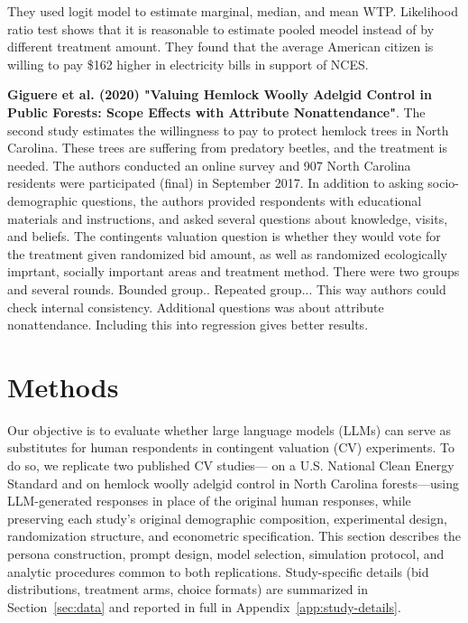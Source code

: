 \documentclass[12pt]{article}
\begin{document}
They used logit model to estimate marginal, median, and mean WTP. Likelihood ratio test shows that it is reasonable to estimate pooled meodel instead of by different treatment amount. They found that the average American citizen is willing to pay \$162 higher in electricity bills in support of NCES.

\textbf{Giguere et al. (2020) "Valuing Hemlock Woolly Adelgid Control in Public Forests: Scope Effects with Attribute Nonattendance"}. The second study estimates the willingness to pay to protect hemlock trees in North Carolina. These trees are suffering from predatory beetles, and the treatment is needed. The authors conducted an online survey and 907 North Carolina residents were participated (final) in September 2017. In addition to asking socio-demographic questions, the authors provided respondents with educational materials and instructions, and asked several questions about knowledge, visits, and beliefs. The contingents valuation question is whether they would vote for the treatment given randomized bid amount, as well as randomized ecologically imprtant, socially important areas and treatment method. There were two groups and several rounds. Bounded group.. Repeated group... This way authors could check internal consistency. Additional questions was about attribute nonattendance. Including this into regression gives better results.



\section{Methods}\label{sec:methods}

Our objective is to evaluate whether large language models (LLMs) can serve as substitutes for human respondents in contingent valuation (CV) experiments. To do so, we replicate two published CV studies---\textcite{Aldy2012} on a U.S. National Clean Energy Standard and \textcite{Giguere2020} on hemlock woolly adelgid control in North Carolina forests---using LLM-generated responses in place of the original human responses, while preserving each study's original demographic composition, experimental design, randomization structure, and econometric specification. This section describes the persona construction, prompt design, model selection, simulation protocol, and analytic procedures common to both replications. Study-specific details (bid distributions, treatment arms, choice formats) are summarized in Section~\ref{sec:data} and reported in full in Appendix~\ref{app:study-details}.
\end{document}
